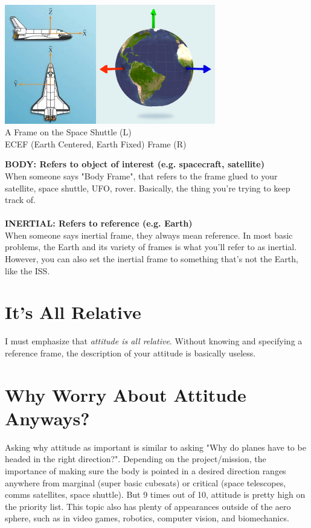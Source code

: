 \documentclass[a4paper,14pt]{extreport}
\begin{document}
\begin{center}
\includegraphics[width=4cm]{shuttle_body_frame}\includegraphics[height=5.2cm]{ecef}\\
A Frame on the Space Shuttle (L) \\ ECEF (Earth Centered, Earth Fixed) Frame (R)
\end{center}
\textbf{BODY: Refers to object of interest (e.g. spacecraft, satellite)}\\
When someone says "Body Frame", that refers to the frame glued to your satellite, space shuttle, UFO, rover. Basically, the thing you're trying to keep track of.\\\\
\textbf{INERTIAL: Refers to reference (e.g. Earth)}\\
When someone says inertial frame, they always mean reference. In most basic problems, the Earth and its variety of frames is what you'll refer to as inertial. However, you can also set the inertial frame to something that's not the Earth, like the ISS.\\

\section{It's All Relative}
I must emphasize that \emph{attitude is all relative}. Without knowing and specifying a reference frame, the description of your attitude is basically useless. 

\section{Why Worry About Attitude Anyways?}
Asking why attitude as important is similar to asking "Why do planes have to be headed in the right direction?". Depending on the project/mission, the importance of making sure the body is pointed in a desired direction ranges anywhere from marginal (super basic cubesats) or critical (space telescopes, comms satellites, space shuttle). But 9 times out of 10, attitude is pretty high on the priority list. This topic also has plenty of appearances outside of the aero sphere, such as in video games, robotics, computer vision, and biomechanics.
\end{document}
